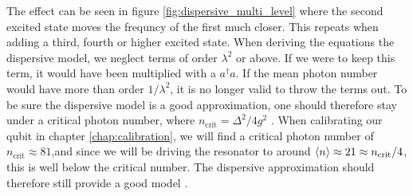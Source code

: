 The effect can be seen in figure \ref{fig:dispersive_multi_level} where the second excited state moves the frequncy of the first much closer. This repeats when adding a third, fourth or higher excited state.
When deriving the equations the dispersive model, we neglect terms of order $\lambda^2$ or above. If we were to keep this term, it would have been multiplied with a $a^\dagger a$. If the mean photon number would have more than order $1 / \lambda^2$, it is no longer valid to throw the terms out. To be sure the dispersive model is a good approximation, one should therefore stay under a critical photon number, where $n_{\text{crit}} = \Delta^2 / 4 g^2$ \cite{krantz_quantum_2019}.
When calibrating our qubit in chapter \ref{chap:calibration}, we will find a critical photon number of $n_{\text{crit}} \approx 81$,and since we will be driving the resonator to around $\expval{n} \approx 21 \approx n_{\text{crit}} / 4$, this is well below the critical number. The dispersive approximation should therefore still provide a good model \cite{boissonneault_dispersive_2009}. 



